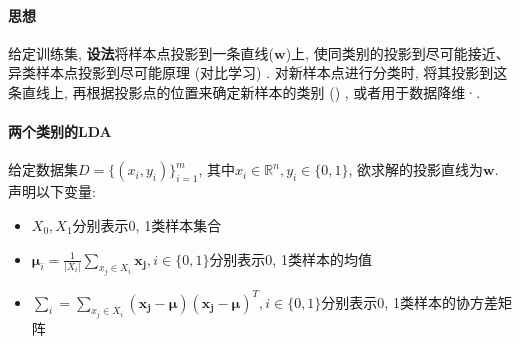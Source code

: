 \paragraph{思想}给定训练集, \textbf{设法}将样本点投影到一条直线($\boldsymbol{w}$)上, 使同类别的投影到尽可能接近、异类样本点投影到尽可能原理 (对比学习) . 对新样本点进行分类时, 将其投影到这条直线上, 再根据投影点的位置来确定新样本的类别 () , 或者用于数据降维·. 

\paragraph{两个类别的LDA}给定数据集$D = \{(x_i, y_i)\}_{i=1}^{m}$, 其中$x_i \in \mathbb{R}^n, y_i \in \{0, 1\}$, 欲求解的投影直线为$\boldsymbol{w}$. 声明以下变量: 
\begin{itemize}
	\item $X_0, X_1$分别表示0, 1类样本集合
	\item $\boldsymbol{\mu}_i = \frac{1}{|X_i|}\sum_{x_j \in X_i} \boldsymbol{x_j}, i\in\{0, 1\}$分别表示0, 1类样本的均值
	\item $\boldsymbol{\sum}_i = \sum_{x_j \in X_i} (\boldsymbol{x_j} - \boldsymbol{\mu}) (\boldsymbol{x_j} - \boldsymbol{\mu})^T, i\in\{0, 1\}$分别表示0, 1类样本的协方差矩阵
\end{itemize}

